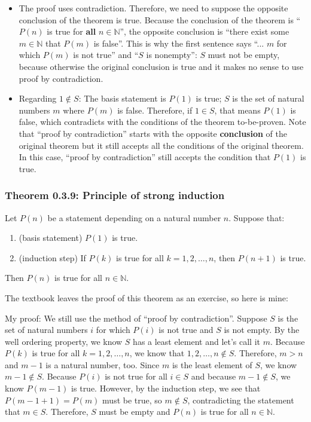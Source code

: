 \documentclass[12pt, letterpaper, oneside]{book}
\begin{document}
\begin{itemize}
  \item The proof uses contradiction. Therefore, we need to suppose the opposite
    conclusion of the theorem is true. Because the conclusion of the theorem is
    ``$P(n)$ is true for \textbf{all} $n \in \mathbb{N}$'', the opposite
    conclusion is ``there exist some $m \in \mathbb{N}$ that $P(m)$ is false''.
    This is why the first sentence says ``... $m$ for which $P(m)$ is not true''
    and ``$S$ is nonempty'': $S$ must not be empty, because otherwise the
    original conclusion is true and it makes no sense to use proof by
    contradiction.
  \item Regarding $1 \notin S$: The basis statement is $P(1)$ is true; $S$ is
    the set of natural numbers $m$ where $P(m)$ is false. Therefore, if $1 \in
    S$, that means $P(1)$ is false, which contradicts with the conditions of
    the theorem to-be-proven. Note that ``proof by contradiction'' starts with
    the opposite \textbf{conclusion} of the original theorem but it still
    accepts all the conditions of the original theorem. In this case, ``proof
    by contradiction'' still accepts the condition that $P(1)$ is true.
\end{itemize}

\subsubsection{Theorem 0.3.9: Principle of strong induction}

Let $P(n)$ be a statement depending on a natural number $n$. Suppose that:

\begin{enumerate}
  \item (basis statement) $P(1)$ is true.
  \item (induction step) If $P(k)$ is true for all $k = 1, 2, \ldots, n$, then
    $P(n+1)$ is true.
\end{enumerate}

Then $P(n)$ is true for all $n \in \mathbb{N}$.

The textbook leaves the proof of this theorem as an exercise, so here is mine:

My proof: We still use the method of ``proof by contradiction''. Suppose $S$ is
the set of natural numbers $i$ for which $P(i)$ is not true and $S$ is not
empty. By the well ordering property, we know $S$ has a least element and let's
call it $m$. Because $P(k)$ is true for all $k = 1, 2, \ldots, n$, we know that
$1, 2, \ldots, n \notin S$. Therefore, $m > n$ and $m-1$ is a natural number,
too. Since $m$ is the least element of $S$, we know $m-1 \notin S$. Because
$P(i)$ is not true for all $i \in S$ and because $m-1 \notin S$, we know
$P(m-1)$ is true. However, by the induction step, we see that $P(m-1+1) = P(m)$
must be true, so $m \notin S$, contradicting the statement that $m \in S$.
Therefore, $S$ must be empty and $P(n)$ is true for all $n \in \mathbb{N}$.
\end{document}
